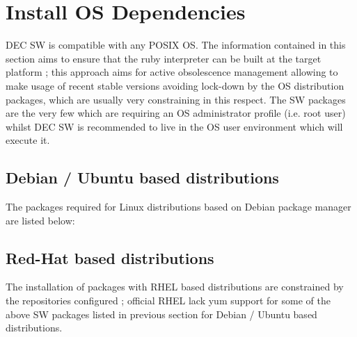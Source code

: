 \documentclass[dec_sum_main.tex]{subfiles}
\begin{document}
\section{Install OS Dependencies}
 DEC SW is compatible with any POSIX OS. The information contained in this section aims to ensure that the ruby interpreter can be built at the target platform ; this approach aims for active obsolescence management allowing to make usage of recent stable versions avoiding lock-down by the OS distribution packages, which are usually very constraining in this respect. The SW packages are the very few which are requiring an OS administrator profile (i.e. root user) whilst DEC SW is recommended to live in the OS user environment which will execute it.
 
 \subsection{Debian / Ubuntu based distributions}
 The packages required for Linux distributions based on Debian package manager are listed below:
 \par
 \noindent
   \newline
   \newline 
   \newline
   \newline
   \newline
   \newline
   \newline
   \newline
   \newline
   \newline
   \newline
   \newline

\subsection{Red-Hat based distributions}
 The installation of packages with RHEL based distributions are constrained by the repositories configured ; official RHEL lack yum support for some of the above SW packages listed in previous section for Debian / Ubuntu based distributions. 
 
\end{document}
